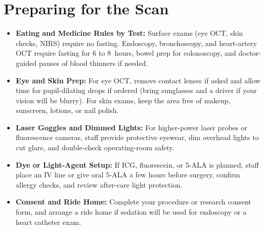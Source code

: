 \section{Preparing for the Scan}
\begin{itemize}
  \item \textbf{Eating and Medicine Rules by Test:} Surface exams (eye OCT, skin checks, NIRS) require no fasting. Endoscopy, bronchoscopy, and heart-artery OCT require fasting for 6 to 8~hours, bowel prep for colonoscopy, and doctor-guided pauses of blood thinners if needed.
  \item \textbf{Eye and Skin Prep:} For eye OCT, remove contact lenses if asked and allow time for pupil-dilating drops if ordered (bring sunglasses and a driver if your vision will be blurry). For skin exams, keep the area free of makeup, sunscreen, lotions, or nail polish.
  \item \textbf{Laser Goggles and Dimmed Lights:} For higher-power laser probes or fluorescence cameras, staff provide protective eyewear, dim overhead lights to cut glare, and double-check operating-room safety.
  \item \textbf{Dye or Light-Agent Setup:} If ICG, fluorescein, or 5-ALA is planned, staff place an IV line or give oral 5-ALA a few hours before surgery, confirm allergy checks, and review after-care light protection.
  \item \textbf{Consent and Ride Home:} Complete your procedure or research consent form, and arrange a ride home if sedation will be used for endoscopy or a heart catheter exam.
\end{itemize}

